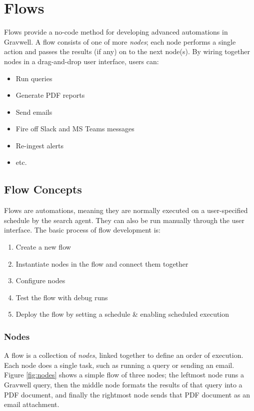 \section{Flows}
\label{sec:flows}
Flows provide a no-code method for developing advanced automations in Gravwell. A flow consists of one of more \emph{nodes}; each node performs a single action and passes the results (if any) on to the next node(s). By wiring together nodes in a drag-and-drop user interface, users can:

\begin{itemize}
\tightlist
\item Run queries
\item Generate PDF reports
\item Send emails
\item Fire off Slack and MS Teams messages
\item Re-ingest alerts
\item etc.
\end{itemize}

\subsection{Flow Concepts}
\label{sec:flow-concepts}

Flows are automations, meaning they are normally executed on a user-specified schedule by the search agent. They can also be run manually through the user interface. The basic process of flow development is:

\begin{enumerate}
\item Create a new flow
\item Instantiate nodes in the flow and connect them together
\item Configure nodes
\item Test the flow with debug runs
\item Deploy the flow by setting a schedule \& enabling scheduled execution
\end{enumerate}

\subsubsection{Nodes}
A flow is a collection of \emph{nodes}, linked together to define an order of execution. Each node does a single task, such as running a query or sending an email. Figure \ref{fig:nodes} shows a simple flow of three nodes; the leftmost node runs a Gravwell query, then the middle node formats the results of that query into a PDF document, and finally the rightmost node sends that PDF document as an email attachment.

